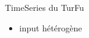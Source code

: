 \begin{frame}{TimeSeries du TurFu}
    \begin{itemize}
        \item input hétérogène
    \end{itemize}
\end{frame}


